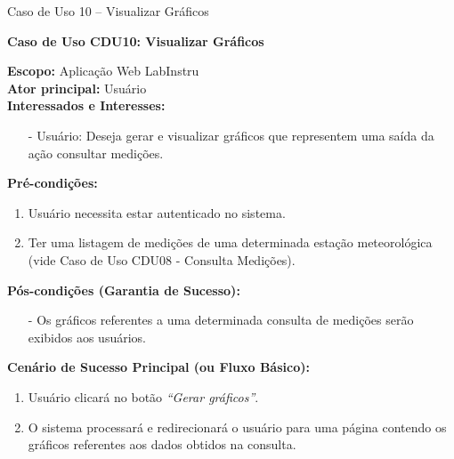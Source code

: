 
\begin{quadro}[h!]\caption{Caso de Uso 10 --  Visualizar Gráficos}
\hfill
\end{quadro}
	\begin{mdframed}

		\textbf{Caso de Uso CDU10: Visualizar Gráficos}\\

		\begin{flushleft}

		\textbf{Escopo:} Aplicação Web LabInstru\\

		\textbf{Ator principal:} Usuário\\

		\textbf{Interessados e Interesses:}
		\begin{itemize}
			\item[-] Usuário: Deseja gerar e visualizar gráficos que representem uma saída da ação consultar medições.
		\end{itemize}

		\textbf{Pré-condições:}\\
			 \begin{enumerate}
			 	\item{Usuário necessita estar autenticado no sistema.}
			 	\item{Ter uma listagem de medições de uma determinada estação meteorológica (vide Caso de Uso CDU08 - Consulta Medições).}
			 \end{enumerate}

		\textbf{Pós-condições (Garantia de Sucesso):}
		\begin{itemize}
			\item[-] Os gráficos referentes a uma determinada consulta de medições serão exibidos aos usuários.
		\end{itemize}

		\textbf{Cenário de Sucesso Principal (ou Fluxo Básico):}\\
			\begin{enumerate}
			 	\item{Usuário clicará no botão \textit{``Gerar gráficos''}.}
			 	\item{O sistema processará e redirecionará o usuário para uma página contendo os gráficos referentes aos dados obtidos na consulta.}
			 \end{enumerate}

		\end{flushleft}

	\end{mdframed}

